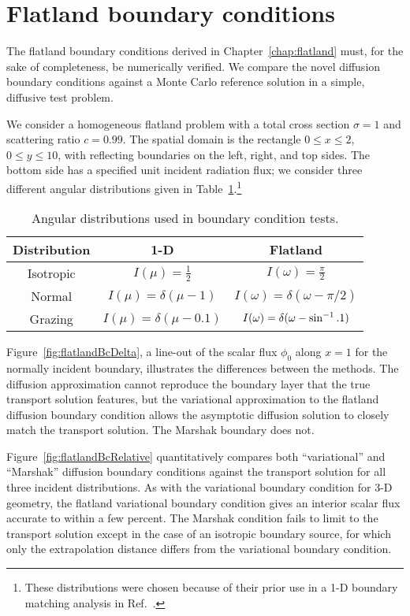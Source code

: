 \section{Flatland boundary conditions}

The flatland boundary conditions derived in Chapter~\ref{chap:flatland} must,
for the sake of completeness, be numerically verified. We compare the novel
diffusion boundary conditions against a Monte Carlo reference solution in a
simple, diffusive test problem.

We consider a homogeneous flatland problem with a
total cross section $\sigma=1$ and scattering ratio $c=0.99$. The spatial 
domain is the rectangle $0 \le x \le 2$, $0 \le y \le 10$, with
reflecting boundaries on the left,
right, and top sides. The bottom side has a specified unit incident radiation
flux; we consider three different angular
distributions given in Table~\ref{tab:angularDistributions}.\footnote{These
distributions were chosen because of their prior use in a 1-D boundary
matching analysis in Ref.~\cite{Dav2006}.}

\begin{table}[htb]
  \centering
  \begin{tabular}{ccc}
\toprule
    Distribution & 1-D & Flatland
\\ \midrule
Isotropic & $I(\mu) = \frac{1}{2}$ & $I(\omega) = \frac{\pi}{2}$
\\
Normal & $I(\mu) = \delta(\mu-1)$ & $I(\omega) = \delta(\omega-\pi/2)$
\\
Grazing & $I(\mu) = \delta(\mu-0.1)$ & $I(\omega) = \delta(\omega-\sin^{-1}.1)$
\\ \bottomrule
  \end{tabular}
  \caption{Angular distributions used in boundary condition tests.}
  \label{tab:angularDistributions}
\end{table}

Figure~\ref{fig:flatlandBcDelta},
 a line-out of the scalar flux $\phi_0$ along
$x=1$ for the normally incident boundary, illustrates the differences between
the methods. The diffusion
approximation cannot reproduce the boundary layer that the true transport
solution features, but the variational approximation to the flatland
diffusion boundary condition allows the asymptotic diffusion solution to
closely match the transport solution. The Marshak boundary does not.

Figure~\ref{fig:flatlandBcRelative} quantitatively compares both ``variational'' and
``Marshak'' diffusion boundary conditions against the transport solution
for all three incident distributions.  
As with the variational boundary condition for 3-D geometry, the flatland
variational boundary condition gives an interior scalar flux accurate to within
a few percent. The Marshak condition fails to limit to the transport solution except in
the case of an isotropic boundary source, for which only the extrapolation
distance differs from the variational boundary condition.

